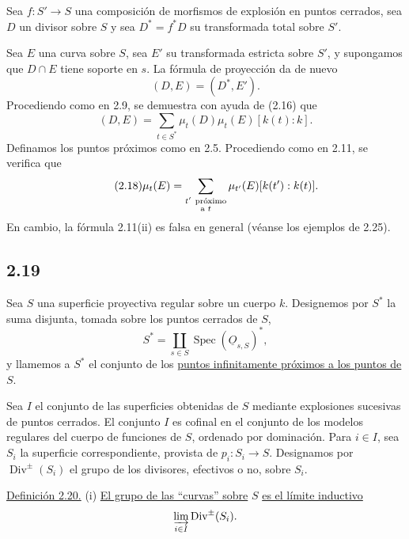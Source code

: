 Sea $f:S'\longrightarrow S$ una composición de morfismos de explosión en puntos
cerrados, sea $D$ un divisor sobre $S$ y sea $D^*=f^*D$ su transformada total
sobre $S'$.

\pageoriginale

Sea $E$ una curva sobre $S$, sea $E'$ su transformada estricta sobre $S'$, y
supongamos que $D\cap E$ tiene soporte en $s$. La fórmula de proyección da de
nuevo
\begin{equation}\tag{2.16}
(D,E)=(D^*,E').
\end{equation}
Procediendo como en 2.9, se demuestra con ayuda de (2.16) que
\begin{equation}\tag{2.17}
(D,E)=\sum_{t\in S^*}\mu_t(D)\mu_t(E)[k(t):k].
\end{equation}
Definamos los puntos próximos como en 2.5. Procediendo como en 2.11, se verifica
que
\begin{equation}\tag{2.18}
\mu_t(E)=
\sum_{\substack{t'\ \text{próximo}\\\text{a }t}}
\mu_{t'}(E)[k(t'):\sisi{k}{k(t)}].
\end{equation}
En cambio, la fórmula 2.11(ii) es falsa en general (véanse los ejemplos de
2.25).

\subsection*{2.19}
Sea $S$ una superficie proyectiva regular sobre un cuerpo $k$. Designemos por
$S^*$ la suma disjunta, tomada sobre los puntos cerrados de $S$,
\begin{equation*}
S^*=\coprod_{s\in S}\operatorname{Spec}(\underline{O}_{s,S})^*,
\end{equation*}
y llamemos a $S^*$ el conjunto de los \underline{puntos infinitamente próximos
a los puntos de} $S$.

Sea $I$ el conjunto de las superficies obtenidas de $S$ mediante explosiones
sucesivas de puntos cerrados. El conjunto $I$ es cofinal en el conjunto de los
modelos regulares del cuerpo de funciones de $S$, ordenado por dominación. Para
$i\in I$, sea $S_i$ la superficie correspondiente, provista de
$p_i:S_i\longrightarrow S$. Designamos por $\operatorname{Div}^{\pm}(S_i)$ el
grupo de los divisores, efectivos o no, sobre $S_i$.

\medskip
\noindent\underline{Definición 2.20.}
(i) \underline{El grupo de las ``curvas'' sobre} $S$ \underline{es el límite
inductivo}
\begin{equation*}
\varinjlim_{i\in I}\operatorname{Div}^{\pm}(S_i).
\end{equation*}

